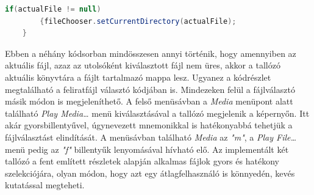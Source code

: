 \begin{lstlisting}[caption=Aktuális könyvtár beállítása, label={lst:aktualis_konyvtar}, language=java]
	if(actualFile != null)
	    {fileChooser.setCurrentDirectory(actualFile);
	}
\end{lstlisting}
        
Ebben a néhány kódsorban mindösszesen annyi történik, hogy amennyiben az aktuális fájl, azaz az utolsóként kiválasztott fájl nem üres, akkor a tallózó aktuális könyvtára a fájlt tartalmazó mappa lesz. Ugyanez a kódrészlet megtalálható a feliratfájl választó kódjában is. Mindezeken felül a fájlválasztó másik módon is megjeleníthető. A felső menüsávban a \textit{Media} menüpont alatt található \textit{Play Media…} menü kiválasztásával a tallózó megjelenik a képernyőn. Itt akár gyorsbillentyűvel, úgynevezett mnemonikkal is hatékonyabbá tehetjük a fájlválasztást elindítását. A menüsávban található \textit{Media} az \textit{"m"}, a \textit{Play File…} menü pedig az \textit{"f"} billentyűk lenyomásával hívható elő.
 Az implementált két tallózó a fent említett részletek alapján alkalmas fájlok gyors és hatékony szelekciójára, olyan módon, hogy azt egy átlagfelhasználó is könnyedén, kevés kutatással megteheti.

